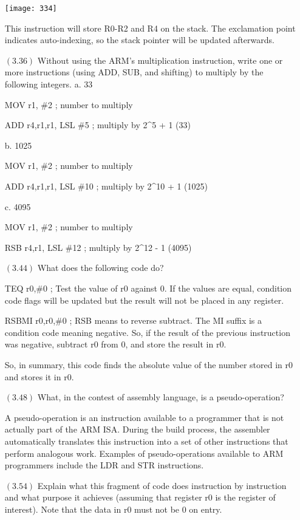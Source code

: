 \documentclass[letterpaper,10pt,titlepage]{article}
\begin{document}
\begin{enumerate}
\begin{center}
\texttt{[image: 334]}
\end{center}

This instruction will store R0-R2 and R4 on the stack. The exclamation point indicates auto-indexing, so the stack pointer will be updated afterwards.


\item[$(3.36)$] Without using the ARM’s multiplication instruction, write one or more instructions (using ADD, SUB, and shifting) to multiply by the following integers.
a. 33

MOV r1, \#2 ; number to multiply

ADD r4,r1,r1, LSL \#5 ; multiply by 2^{5} + 1 (33)

b. 1025

MOV r1, \#2 ; number to multiply

ADD r4,r1,r1, LSL \#10 ; multiply by 2^{10} + 1 (1025)

c. 4095

MOV r1, \#2 ; number to multiply

RSB r4,r1, LSL \#12 ; multiply by 2^{12} - 1 (4095)


\item[$(3.44)$] What does the following code do?

TEQ r0,\#0 ; Test the value of r0 against 0. If the values are equal, condition code flags will be updated but the result will not be placed in any register.

RSBMI r0,r0,\#0 ; RSB means to reverse subtract. The MI suffix is a condition code meaning negative. So, if the result of the previous instruction was negative, subtract r0 from 0, and store the result in r0.


So, in summary, this code finds the absolute value of the number stored in r0 and stores it in r0.


\item[$(3.48)$]What, in the contest of assembly language, is a pseudo-operation?

A  pseudo-operation is an instruction available to a programmer that is not actually part of the ARM ISA. During the build process, the assembler automatically translates this instruction into a set of other instructions that perform analogous work. Examples of pseudo-operations available to ARM programmers include the LDR and STR instructions.


\item[$(3.54)$] Explain what this fragment of code does instruction by instruction and what purpose it achieves (assuming that register r0 is the register of interest). Note that the data in r0 must not be 0 on entry.


\end{enumerate}
\end{document}
